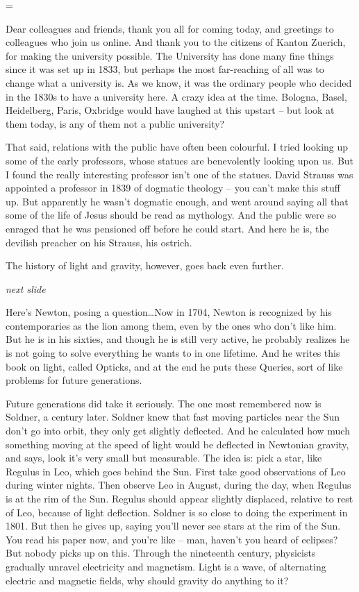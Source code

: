 
\parindent=0pt
\parskip=\smallskipamount

\def\next{{\it next slide}}

Dear colleagues and friends, thank you all for coming today, and
greetings to colleagues who join us online.  And thank you to the
citizens of Kanton Zuerich, for making the university possible.  The
University has done many fine things since it was set up in 1833, but
perhaps the most far-reaching of all was to change what a university
is.  As we know, it was the ordinary people who decided in the 1830s
to have a university here.  A crazy idea at the time. Bologna, Basel,
Heidelberg, Paris, Oxbridge would have laughed at this upstart -- but
look at them today, is any of them not a public university?

That said, relations with the public have often been colourful.  I
tried looking up some of the early professors, whose statues are
benevolently looking upon us.  But I found the really interesting
professor isn't one of the statues. David Strauss was appointed a
professor in 1839 of dogmatic theology -- you can't make this stuff
up.  But apparently he wasn't dogmatic enough, and went around saying
all that some of the life of Jesus should be read as mythology.  And
the public were so enraged that he was pensioned off before he could
start.  And here he is, the devilish preacher on his Strauss, his
ostrich.

The history of light and gravity, however, goes back even further.

\next

Here's Newton, posing a question\dots Now in 1704, Newton is
recognized by his contemporaries as the lion among them, even by the
ones who don't like him.  But he is in his sixties, and though he is
still very active, he probably realizes he is not going to solve
everything he wants to in one lifetime.  And he writes this book on
light, called Opticks, and at the end he puts these Queries, sort of
like problems for future generations.

Future generations did take it seriously.  The one most remembered now
is Soldner, a century later.  Soldner knew that fast moving particles
near the Sun don't go into orbit, they only get slightly deflected.
And he calculated how much something moving at the speed of light
would be deflected in Newtonian gravity, and says, look it's very
small but measurable.  The idea is: pick a star, like Regulus in Leo,
which goes behind the Sun.  First take good observations of Leo during
winter nights.  Then observe Leo in August, during the day, when
Regulus is at the rim of the Sun.  Regulus should appear slightly
displaced, relative to rest of Leo, because of light deflection.
Soldner is so close to doing the experiment in 1801.  But then he
gives up, saying you'll never see stars at the rim of the Sun.  You
read his paper now, and you're like -- man, haven't you heard of
eclipses?  But nobody picks up on this.  Through the nineteenth
century, physicists gradually unravel electricity and magnetism.
Light is a wave, of alternating electric and magnetic fields, why
should gravity do anything to it?

